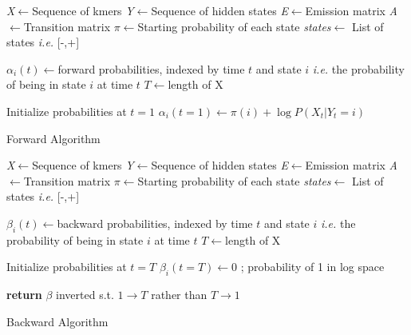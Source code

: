 \begin{algorithm}[H]
\DontPrintSemicolon
{}
\SetAlgoLined
\emph{X}$\leftarrow$Sequence of kmers\;
\emph{Y}$\leftarrow$Sequence of hidden states\;
\emph{E}$\leftarrow$Emission matrix\;
\emph{A}$\leftarrow$Transition matrix\;
\emph{$\pi$}$\leftarrow$Starting probability of each state\;
\emph{states}$\leftarrow$ List of states \emph{i.e.} [-,+]\;
\;

$\alpha_i(t)\leftarrow$forward probabilities, indexed by time $t$ and state $i$ \emph{i.e.} the probability of being in state $i$ at time $t$\;
$T\leftarrow$length of X\;\; 

Initialize probabilities at $t=1$\;
$\alpha_i(t=1)\leftarrow \pi(i) + \log P(X_t |Y_t = i)$\;\;
 \caption{Forward Algorithm}
 \label{fwd}
\end{algorithm}

\begin{algorithm}[H]
\DontPrintSemicolon
{}
\SetAlgoLined
\emph{X}$\leftarrow$Sequence of kmers\;
\emph{Y}$\leftarrow$Sequence of hidden states\;
\emph{E}$\leftarrow$Emission matrix\;
\emph{A}$\leftarrow$Transition matrix\;
\emph{$\pi$}$\leftarrow$Starting probability of each state\;
\emph{states}$\leftarrow$ List of states \emph{i.e.} [-,+]\;
\;

$\beta_i(t)\leftarrow$backward probabilities, indexed by time $t$ and state $i$ \emph{i.e.} the probability of being in state $i$ at time $t$\;
$T\leftarrow$length of X\;\; 

Initialize probabilities at $t=T$\;
$\beta_i(t=T)\leftarrow 0$ ; probability of 1 in log space\;\;

\textbf{return} $\beta$ inverted s.t. $1\rightarrow T$ rather than $T \rightarrow 1$\;
 \caption{Backward Algorithm}
 \label{bwd}
\end{algorithm}
\pagebreak

